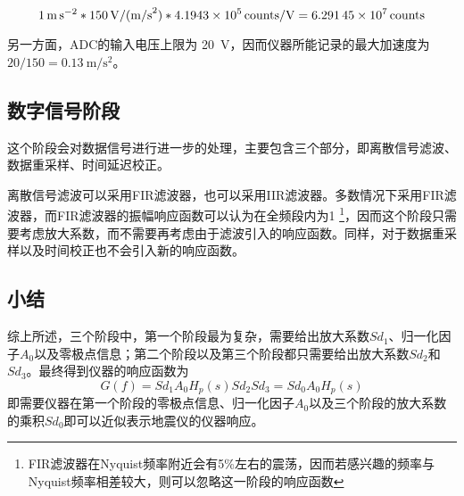 \[
    \SI{1}{\m\per\square\s} *
    \SI{150}{\V\per{(\m\per\square\s)}} *
    \SI{4.1943e5}{counts\per\V} =
    \SI{6.29145e7}{counts}
\]

另一方面，ADC的输入电压上限为 \SI{20}{\V}，因而仪器所能记录的最大加速度为$20/150=\SI{0.13}{\m\per\square\s}$。

\subsection{数字信号阶段}
这个阶段会对数据信号进行进一步的处理，主要包含三个部分，即离散信号滤波、数据重采样、时间延迟校正。

离散信号滤波可以采用FIR滤波器，也可以采用IIR滤波器。多数情况下采用FIR滤波器，而FIR滤波器的振幅响应函数可以认为在全频段内为1
\footnote{FIR滤波器在Nyquist频率附近会有5\%左右的震荡，因而若感兴趣的频率与Nyquist频率相差较大，则可以忽略这一阶段的响应函数}，因而这个阶段只需要考虑放大系数，而不需要再考虑由于滤波引入的响应函数。同样，对于数据重采样以及时间校正也不会引入新的响应函数。

\subsection{小结}
综上所述，三个阶段中，第一个阶段最为复杂，需要给出放大系数$Sd_{1}$、归一化因子$A_0$以及零极点信息；第二个阶段以及第三个阶段都只需要给出放大系数$Sd_{2}$和$Sd_3$。最终得到仪器的响应函数为
\[
    G(f)=Sd_1 A_0 H_p(s) Sd_2 Sd_3=Sd_0 A_0 H_p(s)
\]
即需要仪器在第一个阶段的零极点信息、归一化因子$A_0$以及三个阶段的放大系数的乘积$Sd_0$即可以近似表示地震仪的仪器响应。
